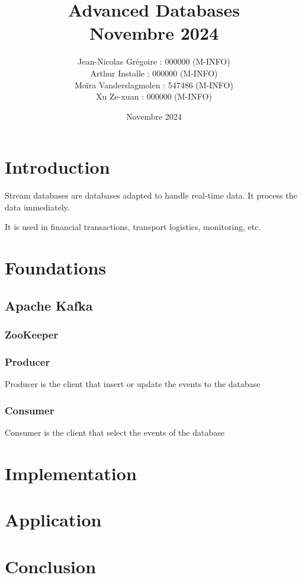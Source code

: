 \documentclass[journal, a4paper]{IEEEtran}
\begin{document}
\title{Advanced Databases \\\vspace*{20pt} \normalsize Novembre 2024}
\author{Jean-Nicolas Grégoire : 000000 (M-INFO) \\
        Arthur Installe : 000000 (M-INFO) \\
        Moïra Vanderslagmolen : 547486 (M-INFO) \\
        Xu Ze-xuan : 000000 (M-INFO)
        }
\date{Novembre 2024}
\maketitle


\section{Introduction}

Stream databases are databases adapted to handle real-time data. It process the data immediately.

It is used in financial transactions, transport logistics, monitoring, etc.

\section{Foundations}

\subsection{Apache Kafka}
\subsubsection{ZooKeeper}

\subsubsection{Producer}

Producer is the client that insert or update the events to the database

\subsubsection{Consumer}

Consumer is the client that select the events of the database

\section{Implementation}

\section{Application}

\section{Conclusion}
\end{document}
